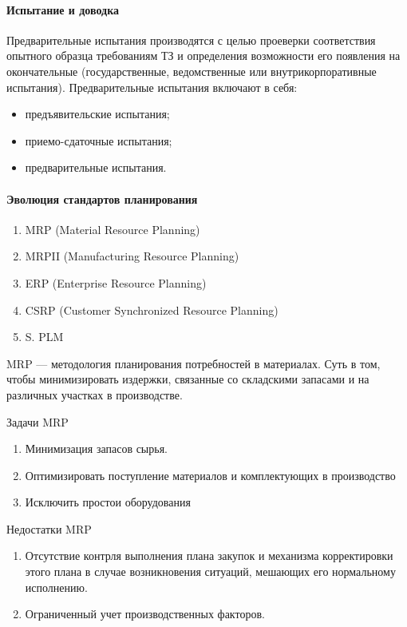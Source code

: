 \paragraph{Испытание и доводка}
Предварительные испытания производятся с целью проеверки соответствия опытного
образца требованиям ТЗ и определения возможности его появления на окончательные
(государственные, ведомственные или внутрикорпоративные испытания).
Предварительные испытания включают в себя:
\begin{itemize}
  \item предъявительские испытания;
  \item приемо-сдаточные испытания;
  \item предварительные испытания.
\end{itemize}

\paragraph{Эволюция стандартов планирования}\mbox{}\par
\begin{enumerate}
  \item MRP (Material Resource Planning)
  \item MRPII (Manufacturing Resource Planning)
  \item ERP (Enterprise Resource Planning)
  \item CSRP (Customer Synchronized Resource Planning)
  \item S. PLM
\end{enumerate}

MRP --- методология планирования потребностей в материалах. Суть в том, чтобы
минимизировать издержки, связанные со складскими запасами и на различных
участках в производстве.\par

Задачи MRP
\begin{enumerate}
  \item Минимизация запасов сырья.
  \item Оптимизировать поступление материалов и комплектующих в производство
  \item Исключить простои оборудования
\end{enumerate}

Недостатки MRP
\begin{enumerate}
  \item Отсутствие контрля выполнения плана закупок и механизма корректировки
    этого плана в случае возникновения ситуаций, мешающих его нормальному
    исполнению.
  \item Ограниченный учет производственных факторов.
\end{enumerate}
